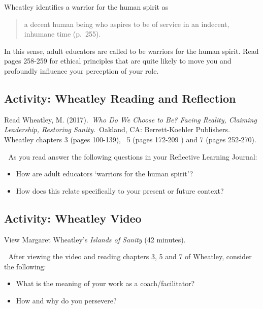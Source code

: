 \documentclass[
]{book}
\providecommand{\tightlist}{%
  \setlength{\itemsep}{0pt}\setlength{\parskip}{0pt}}
\begin{document}
Wheatley identifies a warrior for the human spirit as

\begin{quote}
a decent human being who aspires to be of service in an indecent, inhumane time (p.~255).
\end{quote}

In this sense, adult educators are called to be warriors for the human spirit. Read pages 258-259 for ethical principles that are quite likely to move you and profoundly influence your perception of your role.

\hypertarget{activity-wheatley-reading-and-reflection-1}{%
\subsection{Activity: Wheatley Reading and Reflection}\label{activity-wheatley-reading-and-reflection-1}}

\begin{reflect}
Read Wheatley, M. (2017).~\emph{Who Do We Choose to Be? Facing Reality,
Claiming Leadership, Restoring Sanity.}~Oakland, CA: Berrett-Koehler
Publishers. Wheatley chapters 3 (pages 100-139), ~5 (pages 172-209 ) and
7 (pages 252-270).

💭 As you read answer the following questions in your Reflective Learning
Journal:

\begin{itemize}
\tightlist
\item
  How are adult educators `warriors for the human spirit'?
\item
  How does this relate specifically to your present or future context?
\end{itemize}
\end{reflect}

\hypertarget{activity-wheatley-video}{%
\subsection{Activity: Wheatley Video}\label{activity-wheatley-video}}

\begin{video}
View Margaret Wheatley's \emph{Islands of Sanity} (42 minutes).

💭 After viewing the video and reading chapters 3, 5 and 7 of Wheatley,
consider the following:

\begin{itemize}
\tightlist
\item
  What is the meaning of your work as a coach/facilitator?
\item
  How and why do you persevere?
\end{itemize}
\end{video}
\end{document}
